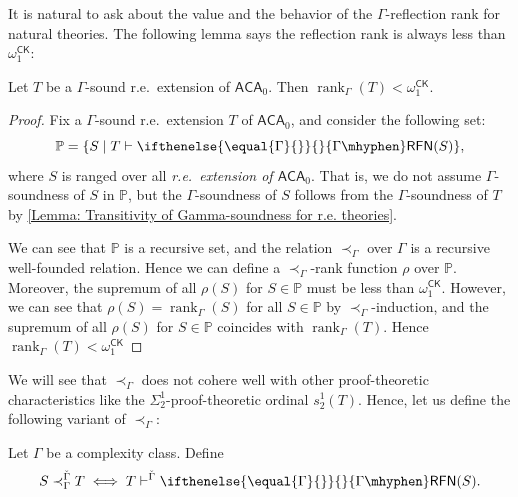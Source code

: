 \documentclass{mhkr}
\newcommand{\added}[1]{#1}
\newcommand{\bbP}{\mathbb{P}}
\newcommand{\rank}{\operatorname{rank}}
\newcommand{\CK}{\mathsf{CK}}
\newcommand{\RFN}[1][]{\ifthenelse{\equal{#1}{}}{}{#1\mhyphen}\mathsf{RFN}}
\newcommand{\ACA}{\mathsf{ACA}}
\begin{document}
It is natural to ask about the value and the behavior of the $\Gamma$-reflection rank for natural theories. The following lemma says the \added{reflection} rank is always less than $\omega_1^\CK$:
\begin{lemma}
    Let $T$ be a $\Gamma$-sound r.e.\ extension of $\ACA_0$. Then $\rank_\Gamma(T)<\omega_1^\CK$.
\end{lemma}
\begin{proof}
    Fix a $\Gamma$-sound r.e.\ extension $T$ of $\ACA_0$, and consider the following set:
    \begin{equation*}
        \mathbb{P}=\{S \mid T\vdash\RFN[\Gamma](S)\},
    \end{equation*}
    where $S$ is ranged over all \emph{r.e.\ extension of $\ACA_0$}. That is, we do not assume $\Gamma$-soundness of $S$ in $\bbP$, but the $\Gamma$-soundness of $S$ follows from the $\Gamma$-soundness of $T$ by \autoref{Lemma: Transitivity of Gamma-soundness for r.e. theories}.
    
    We can see that $\bbP$ is a recursive set, and the relation $\prec_{\Gamma}$ over $\Gamma$ is a recursive well-founded relation. Hence we can define a $\prec_\Gamma$-rank function $\rho$ over $\bbP$. Moreover, the supremum of all $\rho(S)$ for $S\in \bbP$ must be less than $\omega_1^\CK$.
    However, we can see that $\rho(S) = \rank_\Gamma(S)$ for all $S\in \bbP$ by $\prec_\Gamma$-induction, and the supremum of all $\rho(S)$ for $S\in \bbP$ coincides with $\rank_\Gamma(T)$. Hence $\rank_\Gamma(T) < \omega_1^\CK$
\end{proof}

We will see that $\prec_\Gamma$ does not cohere well with other proof-theoretic characteristics like the $\Sigma^1_2$-proof-theoretic ordinal $s^1_2(T)$. Hence, let us define the following variant of $\prec_\Gamma$:

\begin{definition}
    Let $\Gamma$ be a complexity class. Define
    \begin{equation*}
        S\prec^{\check{\Gamma}}_\Gamma T\iff T\vdash^{\check{\Gamma}} \RFN[\Gamma](S).
    \end{equation*}
\end{definition}
\end{document}
